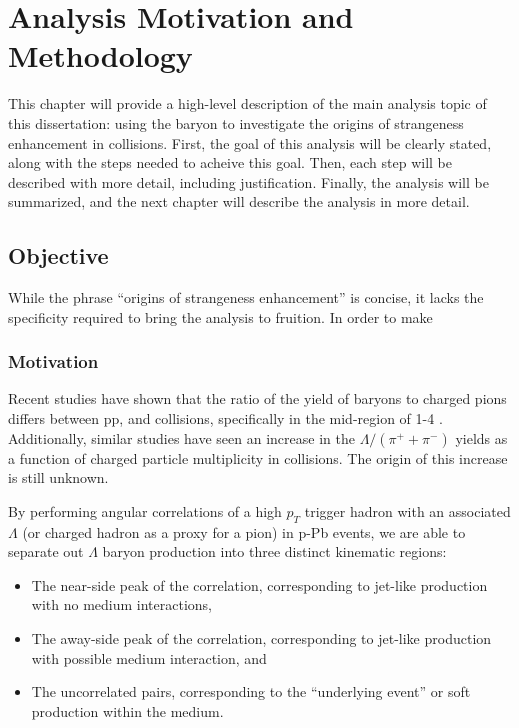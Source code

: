 \chapter{Analysis Motivation and Methodology}

This chapter will provide a high-level description of the main analysis topic of this dissertation: using the \lmb baryon to investigate the origins of strangeness enhancement in \pPb collisions. First, the goal of this analysis will be clearly stated, along with the steps needed to acheive this goal. Then, each step will be described with more detail, including justification. Finally, the analysis will be summarized, and the next chapter will describe the analysis in more detail.

\section{Objective}
While the phrase ``origins of strangeness enhancement'' is concise, it lacks the specificity required to bring the analysis to fruition. In order to make 


\subsection{Motivation}
\label{motivation}
Recent studies have shown that the ratio of the yield of \lmb baryons to charged pions differs between pp, \pPb and \PbPb collisions, specifically in the mid-\pt region of 1-4 \GeVc.  Additionally, similar studies have seen an increase in the $\Lambda/(\pi^{+} + \pi^{-})$ yields as a function of charged particle multiplicity in \pPb collisions. The origin of this increase is still unknown.

By performing angular correlations of a high $p_T$ trigger hadron with an associated $\Lambda$ (or charged hadron as a proxy for a pion) in p-Pb events, we are able to separate out $\Lambda$ baryon production into three distinct kinematic regions:
\begin{itemize}
\item The near-side peak of the correlation, corresponding to jet-like production with no medium interactions,
\item The away-side peak of the correlation, corresponding to jet-like production with possible medium interaction, and
\item The uncorrelated pairs, corresponding to the ``underlying event'' or soft production within the medium.
\end{itemize}

